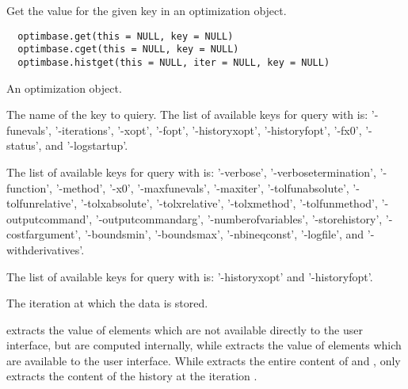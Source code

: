 %
\begin{Description}\relax
Get the value for the given key in an optimization object. 
\end{Description}
%
\begin{Usage}
\begin{verbatim}
  optimbase.get(this = NULL, key = NULL)
  optimbase.cget(this = NULL, key = NULL)
  optimbase.histget(this = NULL, iter = NULL, key = NULL)
\end{verbatim}
\end{Usage}
%
\begin{Arguments}
\begin{ldescription}
\item[\code{this}] An optimization object.
\item[\code{key}] The name of the key to quiery. The list of available keys for
query with  is: '-funevals', '-iterations', '-xopt',
'-fopt', '-historyxopt', '-historyfopt', '-fx0', '-status', and
'-logstartup'.

The list of available keys for query with  is:
'-verbose', '-verbosetermination', '-function', '-method', '-x0',
'-maxfunevals', '-maxiter', '-tolfunabsolute', '-tolfunrelative',
'-tolxabsolute', '-tolxrelative', '-tolxmethod', '-tolfunmethod',
'-outputcommand', '-outputcommandarg', '-numberofvariables',
'-storehistory', '-costfargument', '-boundsmin', '-boundsmax',
'-nbineqconst', '-logfile', and '-withderivatives'.

The list of available keys for query with  is:
'-historyxopt' and '-historyfopt'.

\item[\code{iter}] The iteration at which the data is stored.
\end{ldescription}
\end{Arguments}
%
\begin{Details}\relax
{} extracts the value of elements which are not available
directly to the user interface, but are computed internally, while
 extracts the value of elements which are available to
the user interface. While  extracts the entire content of
 and ,  only
extracts the content of the history at the iteration .
\end{Details}
